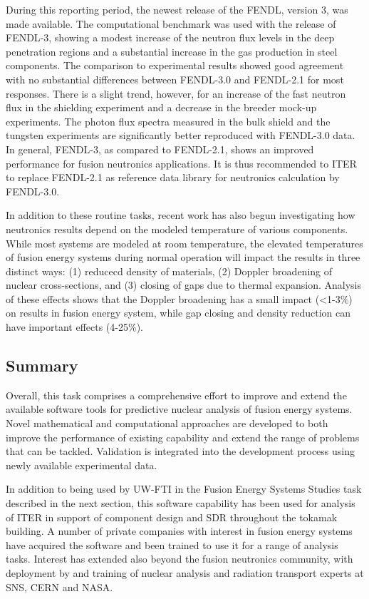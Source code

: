 During this reporting period, the newest release of the \gls{FENDL}, version
3, was made available.  The computational benchmark was used with the
release of \gls{FENDL}-3, showing a modest increase of the neutron flux levels
in the deep penetration regions and a substantial increase in the gas
production in steel components.  The comparison to experimental results showed
good agreement with no substantial differences between FENDL-3.0 and FENDL-2.1
for most responses.  There is a slight trend, however, for an increase of the
fast neutron flux in the shielding experiment and a decrease in the breeder
mock-up experiments. The photon flux spectra measured in the bulk shield and
the tungsten experiments are significantly better reproduced with FENDL-3.0
data. In general, FENDL-3, as compared to FENDL-2.1, shows an improved
performance for fusion neutronics applications. It is thus recommended to ITER
to replace FENDL-2.1 as reference data library for neutronics calculation by
FENDL-3.0.\cite{fischer_benchmarking_2014, bohm_impact_2015}

In addition to these routine tasks, recent work has also begun investigating
how neutronics results depend on the modeled temperature of various
components.  While most systems are modeled at room temperature, the elevated
temperatures of fusion energy systems during normal operation will impact the
results in three distinct ways: (1) reducecd density of materials, (2) Doppler
broadening of nuclear cross-sections, and (3) closing of gaps due to thermal
expansion.  Analysis of these effects shows that the Doppler broadening has a
small impact (<1-3\%) on results in fusion energy system, while gap closing
and density reduction can have important effects (4-25\%).

\subsection{Summary}

Overall, this task comprises a comprehensive effort to improve and extend the
available software tools for predictive nuclear analysis of fusion energy
systems.  Novel mathematical and computational approaches are developed to
both improve the performance of existing capability and extend the range of
problems that can be tackled.  Validation is integrated into the development
process using newly available experimental data.

In addition to being used by \gls{UW-FTI} in the Fusion Energy Systems Studies
task described in the next section, this software capability has been used for
analysis of ITER in support of component design and \gls{SDR} throughout the
tokamak building.  A number of private companies with interest in fusion
energy systems have acquired the software and been trained to use it for a
range of analysis tasks.  Interest has extended also beyond the fusion
neutronics community, with deployment by and training of nuclear analysis and
radiation transport experts at \gls{SNS}, CERN and NASA.

